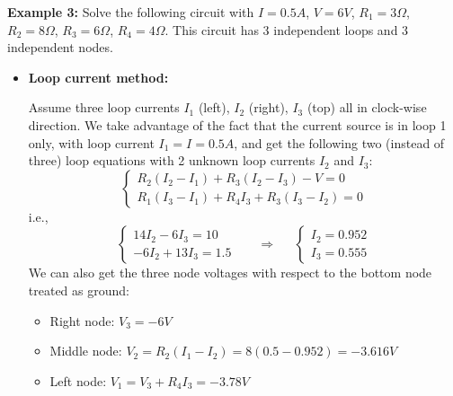 {\bf Example 3:} Solve the following circuit with $I=0.5 A$, $V=6 V$, 
$R_1=3\Omega$, $R_2=8\Omega$, $R_3=6\Omega$, $R_4=4\Omega$. This circuit
has 3 independent loops and 3 independent nodes.


\begin{itemize}
\item {\bf Loop current method:}

  Assume three loop currents $I_1$ (left), $I_2$ (right), $I_3$ (top) all 
  in clock-wise direction. We take advantage of the fact that the current 
  source is in loop 1 only, with loop current $I_1=I=0.5A$, and get the 
  following two (instead of three) loop equations with 2 unknown loop 
  currents $I_2$ and $I_3$:
  \[ 
  \left\{ \begin{array}{l} R_2(I_2-I_1)+R_3(I_2-I_3)-V=0 \\
    R_1(I_3-I_1)+R_4I_3+R_3(I_3-I_2)=0 \end{array} \right. 
  \]
  i.e.,
  \[
  \left\{ \begin{array}{l}
    14 I_2-6 I_3=10 \\   -6 I_2+13 I_3=1.5 \end{array} \right. 
  \;\;\;\;\;\;\Longrightarrow \;\;\;\;\;
  \left\{ \begin{array}{l}
    I_2=0.952 \\  I_3=0.555 \end{array} \right. 
  \]
  We can also get the three node voltages with respect to the bottom 
  node treated as ground: 
  \begin{itemize}
    \item Right node: $V_3=-6V$ 
    \item Middle node: $V_2=R_2(I_1-I_2)=8(0.5-0.952)=-3.616V$ 
    \item Left node: $V_1=V_3+R_4 I_3=-3.78 V$ 
  \end{itemize}


\end{itemize}
